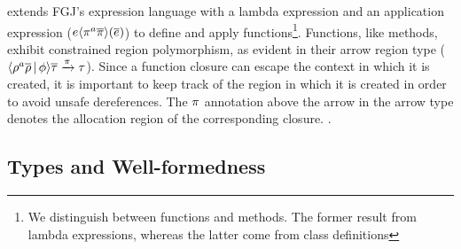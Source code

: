 \FB extends FGJ's expression language with a lambda expression and an
application expression ($e\langle \pi^a\overline{\pi} \rangle(\overline{e})$) to define
and apply functions\footnote{We distinguish between functions and
methods. The former result from lambda expressions, whereas the latter
come from class definitions}. Functions, like methods, exhibit
constrained region polymorphism, as evident in their arrow region type
($\langle \rho^a\overline{\rho} \,|\, \phi \rangle\overline{\tau} \xrightarrow{\pi}
\tau$).
Since a function closure can escape the context in which it is
created, it is important to keep track of the region in which it is
created in order to avoid unsafe dereferences. The $\pi$ annotation
above the arrow in the arrow type denotes the allocation region of the
corresponding closure. 
. 

\subsection{Types and Well-formedness}

